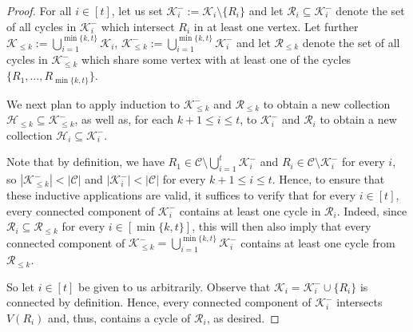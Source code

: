 \documentclass[10pt,a4paper]{amsart}
\begin{document}
\begin{proof}
    For all $i\in [t]$, let us set $\mathcal K_i^-:= \mathcal K_i\setminus \{R_i\}$ and let $\mathcal R_i\subseteq \mathcal K_i^-$ denote the set of all cycles in $\mathcal{K}_i^-$ which intersect $R_i$ in at least one vertex. Let further $\mathcal K_{\leq k}:=\bigcup_{i=1}^{\min\{k,t\}} \mathcal K_i$, $\mathcal K_{\leq k}^-:=\bigcup_{i=1}^{\min\{k,t\}}\mathcal K_i^-$ and let $\mathcal R_{\leq k}$ denote the set of all cycles in $\mathcal{K}_{\le k}^-$ which share some vertex with at least one of the cycles $\{R_1,\ldots,R_{\min\{k,t\}}\}$.

    We next plan to apply induction to $\mathcal K_{\leq k}^-$ and $\mathcal R_{\leq k}$ to obtain a new collection $\mathcal H_{\leq k}\subseteq \mathcal K_{\le k}^-$, as well as, for each $k+1\leq i\leq t$, to $\mathcal K_i^-$ and $\mathcal R_i$ to obtain a new collection $\mathcal H_i\subseteq \mathcal K_i^-$. 

    Note that by definition, we have $R_1 \in \mathcal C \setminus \bigcup_{i=1}^{t}\mathcal K_i^-$ and $R_i\in \mathcal C\setminus \mathcal K_i^-$ for every $i$, so $|\mathcal{K}_{\le k}^-|<|\mathcal C|$ and $|\mathcal{K}_i^-|<|\mathcal{C}|$ for every $k+1\le i \le t$. Hence, to ensure that these inductive applications are valid, it suffices to verify that for every $i\in [t]$, every connected component of $\mathcal{K}_i^-$ contains at least one cycle in $\mathcal R_i$. Indeed, since $\mathcal{R}_i\subseteq \mathcal{R}_{\le k}$ for every $i\in [\min\{k,t\}]$, this will then also imply that every connected component of $\mathcal{K}_{\le k}^-=\bigcup_{i=1}^{\min\{k,t\}}\mathcal{K}_i^-$ contains at least one cycle from $\mathcal{R}_{\le k}$. 

   So let $i\in [t]$ be given to us arbitrarily. Observe that $\mathcal K_i=\mathcal K_i^-\cup \{R_i\}$ is connected by definition. Hence, every connected component of $\mathcal K_i^-$ intersects $V(R_i)$ and, thus, contains a cycle of $\mathcal R_i$, as desired. 


\end{proof}
\end{document}
